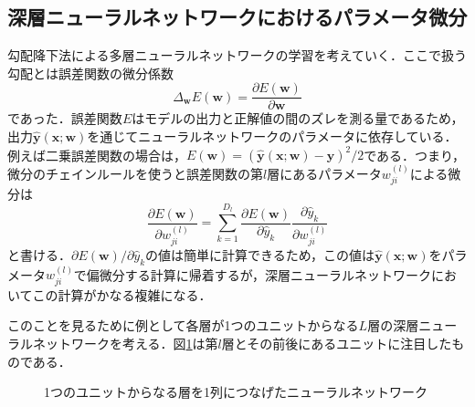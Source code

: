\documentclass[a4paper,11pt]{jsreport}
\begin{document}
\subsection{深層ニューラルネットワークにおけるパラメータ微分}
勾配降下法による多層ニューラルネットワークの学習を考えていく．ここで扱う勾配とは誤差関数の微分係数
\begin{equation}
  \Delta_{\bm{w}}E(\bm{w}) = \frac{\partial E(\bm{w})}{\partial \bm{w}}
\end{equation}
であった．誤差関数$E$はモデルの出力と正解値の間のズレを測る量であるため，出力$\hat{\bm{y}}(\bm{x};\bm{w})$を通じてニューラルネットワークのパラメータに依存している．例えば二乗誤差関数の場合は，$E(\bm{w}) = (\hat{\bm{y}}(\bm{x};\bm{w}) - \bm{y})^2 / 2$である．つまり，微分のチェインルールを使うと誤差関数の第$l$層にあるパラメータ$w_{ji}^{(l)}$による微分は
\begin{equation}
  \frac{\partial E(\bm{w})}{\partial w_{ji}^{(l)}} 
  = \sum_{k=1}^{D_l} \frac{\partial E(\bm{w})}{\partial \hat{y}_k} \frac{\partial \hat{y}_k}{\partial w_{ji}^{(l)}} 
\end{equation}
と書ける．$\partial E(\bm{w}) / \partial \hat{y}_k$の値は簡単に計算できるため，この値は$\hat{\bm{y}}(\bm{x};\bm{w})$をパラメータ$w_{ji}^{(l)}$で偏微分する計算に帰着するが，深層ニューラルネットワークにおいてこの計算がかなる複雑になる．\par
このことを見るために例として各層が1つのユニットからなる$L$層の深層ニューラルネットワークを考える．図\ref{チェインニューラルネットワーク}は第$l$層とその前後にあるユニットに注目したものである．
\begin{figure}[H]
  \begin{center}
    \caption{1つのユニットからなる層を1列につなげたニューラルネットワーク}
    \label{チェインニューラルネットワーク}
  \end{center}
\end{figure}
\end{document}
